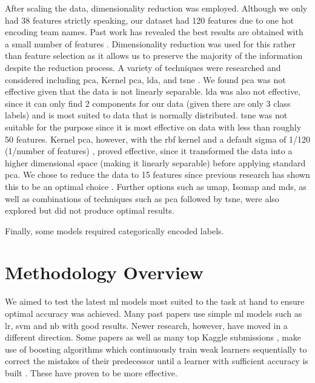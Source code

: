 \documentclass{article}
\begin{document}
After scaling the data, dimensionality reduction was employed. Although we only had 38 features strictly speaking, our dataset had 120 features due to one hot encoding team names. Past work has revealed the best results are obtained with a small number of features \cite{horvat2020use}. Dimensionality reduction was used for this rather than feature selection as it allows us to preserve the majority of the information despite the reduction process. A variety of techniques were researched and considered including \gls{pca}, Kernel \gls{pca}, \gls{lda}, and \gls{tsne} \cite{pramodithamediumdimensionality}. We found \gls{pca} was not effective given that the data is not linearly separable. \gls{lda} was also not effective, since it can only find 2 components for our data (given there are only 3 class labels) and is most suited to data that is normally distributed. \gls{tsne} was not suitable for the purpose since it is most effective on data with less than roughly 50 features. Kernel \gls{pca}, however, with the \gls{rbf} kernel and a default sigma of 1/120 (1/number of features) , proved effective, since it transformed the data into a higher dimensional space (making it linearly separable) before applying standard \gls{pca}. We chose to reduce the data to 15 features since previous research has shown this to be an optimal choice \cite{horvat2020use}. Further options such as \gls{umap}, Isomap and \gls{mds}, \cite{sivarajahmediumdimensionality} as well as combinations of techniques such as \gls{pca} followed by \gls{tsne}, were also explored but did not produce optimal results.

Finally, some models required categorically encoded labels. 

\section{Methodology Overview}
\label{methodology}

We aimed to test the latest \gls{ml} models most suited to the task at hand to ensure optimal accuracy was achieved. Many past papers use simple \gls{ml} models such as \gls{lr}, \gls{svm} and \gls{nb} \cite{knoll2020machine, teli2018prediction} with good results. Newer research, however, have moved in a different direction. Some papers \cite{tax2015predicting, buursma2011predicting, hucaljuk2011predicting, kampakis2015using} as well as many top Kaggle submissions \cite{kaggleuddinmatchprediction}, make use of boosting algorithms which continuously train weak learners sequentially to correct the mistakes of their predecessor until a learner with sufficient accuracy is built \cite{souzamediumquickguideboosting}. These have proven to be more effective.  
\end{document}
